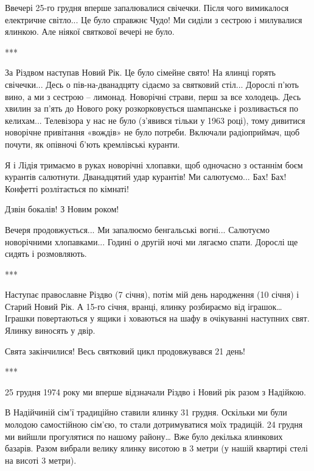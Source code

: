 
Ввечері 25-го грудня вперше запалювалися свічечки. Після чого вимикалося
електричне світло... Це було справжнє Чудо! Ми сиділи з сестрою і милувалися
ялинкою. Але ніякої святкової вечері не було.


***

За Різдвом наступав Новий Рік. Це було сімейне свято! На ялинці горять
свічечки... Десь о пів-на-дванадцяту сідаємо за святковий стіл... Дорослі п’ють
вино, а ми з сестрою – лимонад. Новорічні страви, перш за все холодець. Десь
хвилин за п’ять до Нового року розкорковується шампанське і розливається по
келихам... Телевізора у нас не було (з’явився тільки  у 1963 році), тому дивитися
новорічне привітання «вождів» не було потреби. Включали радіоприймач, щоб
почути, як опівночі б’ють кремлівські куранти. 


Я і Лідія тримаємо в руках новорічні хлопавки, щоб одночасно з останнім боєм
курантів салютнути. Дванадцятий удар курантів! Ми салютуємо... Бах! Бах! Конфетті
розлітається по кімнаті! 

Дзвін бокалів! З Новим роком! 

Вечеря продовжується... Ми запалюємо бенгальські вогні... Салютуємо новорічними
хлопавками... Годині о другій ночі ми лягаємо спати. Дорослі ще сидять і
розмовляють.


***

Наступає православне Різдво (7 січня), потім мій день народження (10 січня) і
Старий Новий Рік. А 15-го січня, вранці, ялинку розбираємо від іграшок… Іграшки
повертаються у ящики і ховаються на шафу в очікуванні наступних свят. Ялинку
виносять у двір.

Свята закінчилися! Весь святковий цикл продовжувався 21 день!


***

25 грудня 1974 року ми вперше відзначали Різдво і Новий рік разом з Надійкою. 

В Надійчиній сім’ї традиційно ставили ялинку 31 грудня. Оскільки ми були
молодою самостійною сім’єю, то стали дотримуватися моїх традицій. 24 грудня ми
вийшли прогулятися по нашому району… Вже було декілька ялинкових базарів. Разом
вибрали велику ялинку висотою в 3 метри (у нашій квартирі стелі на висоті 3
метри). 

